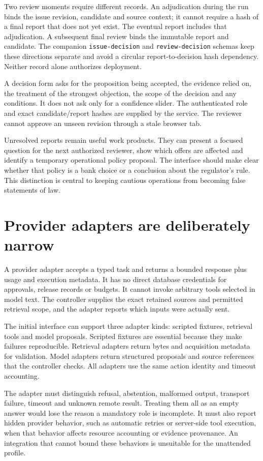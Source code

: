 \documentclass[12pt,a4paper,oneside,openany]{book}
\begin{document}
Two review moments require different records. An adjudication during the run
binds the issue revision, candidate and source context; it cannot require a hash
of a final report that does not yet exist. The eventual report includes that
adjudication. A subsequent final review binds the immutable report and candidate.
The companion \texttt{issue-decision} and \texttt{review-decision} schemas keep
these directions separate and avoid a circular report-to-decision hash dependency.
Neither record alone authorizes deployment.

A decision form asks for the proposition being accepted, the evidence relied on,
the treatment of the strongest objection, the scope of the decision and any
conditions. It does not ask only for a confidence slider. The authenticated role
and exact candidate/report hashes are supplied by the service. The reviewer
cannot approve an unseen revision through a stale browser tab.

Unresolved reports remain useful work products. They can present a focused
question for the next authorized reviewer, show which offers are affected and
identify a temporary operational policy proposal. The interface should make clear
whether that policy is a bank choice or a conclusion about the regulator's rule.
This distinction is central to keeping cautious operations from becoming false
statements of law.

\section{Provider adapters are deliberately narrow}

A provider adapter accepts a typed task and returns a bounded response plus usage
and execution metadata. It has no direct database credentials for approvals,
release records or budgets. It cannot invoke arbitrary tools selected in model
text. The controller supplies the exact retained sources and permitted retrieval
scope, and the adapter reports which inputs were actually sent.

The initial interface can support three adapter kinds: scripted fixtures,
retrieval tools and model proposals. Scripted fixtures are essential because they
make failures reproducible. Retrieval adapters return bytes and acquisition
metadata for validation. Model adapters return structured proposals and source
references that the controller checks. All adapters use the same action identity
and timeout accounting.

The adapter must distinguish refusal, abstention, malformed output, transport
failure, timeout and unknown remote result. Treating them all as an empty answer
would lose the reason a mandatory role is incomplete. It must also report hidden
provider behavior, such as automatic retries or server-side tool execution, when
that behavior affects resource accounting or evidence provenance. An integration
that cannot bound these behaviors is unsuitable for the unattended profile.
\end{document}
